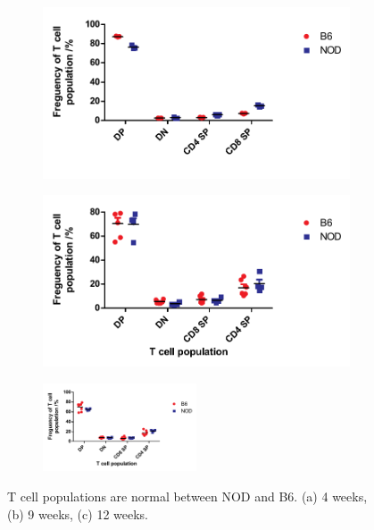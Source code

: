 \begin{figure}
	\begin{subfigure}{0.5\textwidth}
	\includegraphics[width=\textwidth]{Figures/4wkThyTcells.pdf}
	\caption{}
	\label{subfig:4wkThyTcells}
	\end{subfigure}
	\begin{subfigure}{0.5\textwidth}
 	\includegraphics[width=\textwidth]{Figures/9wkThyTcells.pdf}
	\caption{}
	\label{subfig:9wkThyTcells}
	\end{subfigure}
	\begin{subfigure}{\textwidth}
	\centering
 	\includegraphics[width=0.5\textwidth]{Figures/12wkThyTcells.pdf}
	\caption{}
	\label{subfig:12wkThyTcells}
	\end{subfigure}
\caption[T cell development is normal in the NOD mouse]{T cell populations are normal between NOD and B6. (a) 4 weeks, (b) 9 weeks, (c) 12 weeks.}
\label{fig:NODB6Tcells}
\end{figure}

